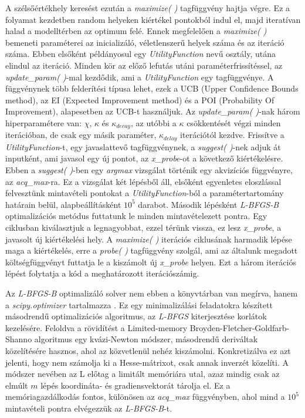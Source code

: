 		A szélsőértékhely keresést ezután a \textit{maximize( )} tagfüggvény hajtja végre. Ez a folyamat kezdetben random helyeken kiértékel pontokból indul el, majd iteratívan halad a modelltérben az optimum felé. Ennek megfelelően a \textit{maximize( )} bemeneti paraméterei az inicializáló, véletlenszerű helyek száma és az iteráció száma. Ebben elsőként példányosul egy \textit{UtilityFunction} nevű osztály, utána elindul az iteráció. 
		Minden kör az előző lefutás utáni paraméterfrissítéssel, az \textit{update\_param( )}-mal kezdődik, ami a \textit{UtilityFunction} egy tagfüggvénye. A függvénynek több felderítési típusa lehet, ezek a UCB (Upper Confidence Bounds method), az EI (Expected Improvement method) és a POI (Probability Of Improvement), alapesetben az UCB-t használjuk. Az \textit{update\_param( )}-nak három hiperparamétere van: $\chi$, $\kappa$ és $\kappa_{decay}$, az utóbbi a $\kappa$ csökkentését végzi minden iterációban, de csak egy másik paraméter, $\kappa_{delay}$ iterációtól kezdve.
		Frissítve a \textit{UtilityFunction}-t, egy javaslattevő tagfüggvénynek, a \textit{suggest( )}-nek adjuk át inputként, ami javasol egy új pontot, az \textit{x\_probe}-ot a következő kiértékelésre. Ebben a \textit{suggest( )}-ben egy \textit{argmax} vizsgálat történik egy akvizíciós függvényre, az \textit{acq\_max}-ra. Ez a vizsgálat két lépésből áll, elsőként egyenletes eloszlással felvesztünk mintavételi pontokat a \textit{UtilityFunction}-ból a paramétertartomány határain belül, alapbeállításként $10^{5}$ darabot. Második lépésként \textit{L-BFGS-B} optimalizációs metódus futtatunk le minden mintavételezett pontra. Egy ciklusban kiválasztjuk a legnagyobbat, ezzel térünk vissza, ez lesz \textit{x\_probe}, a javasolt új kiértékelési hely.
		A \textit{maximize( )} iterációs ciklusának harmadik lépése maga a kiértékelés, erre a \textit{probe( )} tagfüggvény szolgál, ami az általunk megadott költségfüggvényt futtatja le a kiszámolt új \textit{x\_probe} helyen. Ezt a három iterációs lépést folytatja a kód a meghatározott iterációszámig.
	
		Az \textit{L-BFGS-B} optimalizáló solver nem ebben a könyvtárban van megírva, hanem a \textit{scipy.optimizer} tartalmazza \cite{scipy}. Ez egy minimalizálási feladatokra készített másodrendű optimalizációs algoritmus, az \textit{L-BFGS} kiterjesztése korlátok kezelésére. Feloldva a rövidítést a Limited-memory Broyden-Fletcher-Goldfarb-Shanno algoritmus egy kvázi-Newton módszer, másodrendű deriváltak közelítésére hasznos, ahol az közvetlenül nehéz kiszámolni. Konkretizálva ez azt jelenti, hogy nem számolja ki a Hesse-mátrixot, csak annak inverzét közelíti. A módszer nevében az L előtag a limitált memóriára utal, azaz mindig csak az elmúlt $m$ lépés koordináta- és gradiensvektorát tárolja el. Ez a memóriagazdálkodás fontos, különösen az \textit{acq\_max} függvényben, ahol mind a $10^{5}$ mintavételi pontra elvégezzük az \textit{L-BFGS-B}-t.
	
